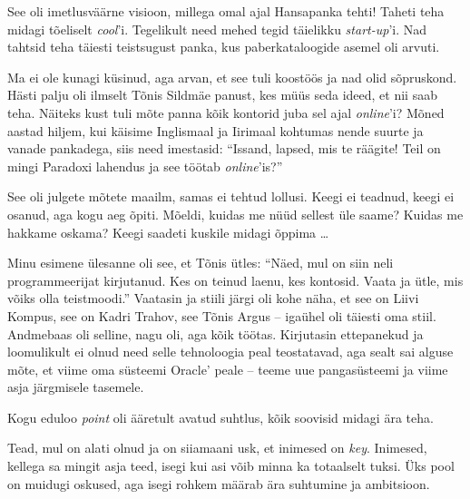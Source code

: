 
See oli imetlusväärne visioon, millega omal ajal Hansapanka 
tehti! Taheti teha midagi tõeliselt \emph{cool}'i. Tegelikult need mehed tegid täielikku \emph{start-up}'i. 
Nad tahtsid teha täiesti teistsugust panka, kus paberkataloogide asemel oli 
arvuti. 


Ma ei ole kunagi küsinud, aga arvan, et see tuli koostöös ja nad olid sõpruskond. 
Hästi palju oli ilmselt Tõnis Sildmäe panust, kes
müüs seda ideed, et nii saab teha. Näiteks kust tuli mõte panna kõik kontorid juba sel ajal \emph{online}'i? 
Mõned aastad hiljem, kui käisime Inglismaal ja Iirimaal kohtumas nende 
suurte ja vanade pankadega, siis need imestasid: \enquote{Issand, lapsed, mis 
te räägite! Teil on mingi Paradoxi lahendus ja see töötab \emph{online}'is?}

See oli julgete mõtete maailm, samas ei tehtud 
lollusi. Keegi ei teadnud, keegi ei osanud, aga kogu aeg õpiti. Mõeldi, 
kuidas me nüüd sellest üle saame? Kuidas me hakkame oskama? Keegi saadeti
kuskile midagi õppima \dots 

Minu esimene ülesanne oli see, et 
Tõnis ütles: \enquote{Näed, mul on siin neli 
programmeerijat kirjutanud. Kes on teinud laenu, kes kontosid. Vaata 
ja ütle, mis võiks olla teistmoodi.} Vaatasin ja stiili 
järgi oli kohe näha, et see on Liivi Kompus, see on Kadri Trahov, see Tõnis 
Argus -- igaühel oli täiesti oma stiil. Andmebaas oli selline, nagu oli, aga kõik
töötas. Kirjutasin ettepanekud ja loomulikult ei olnud need 
selle tehnoloogia peal teostatavad, aga sealt sai alguse mõte, et viime oma 
süsteemi Oracle' peale -- teeme uue pangasüsteemi ja viime asja järgmisele 
tasemele.

Kogu eduloo \emph{point} oli ääretult avatud 
suhtlus, kõik soovisid midagi ära teha. 


Tead, mul on alati olnud ja on siiamaani usk, et inimesed on \emph{key}. Inimesed, kellega sa 
mingit asja teed, isegi kui asi võib minna ka totaalselt 
tuksi. Üks pool on muidugi oskused, aga isegi rohkem 
määrab ära suhtumine ja ambitsioon. 

